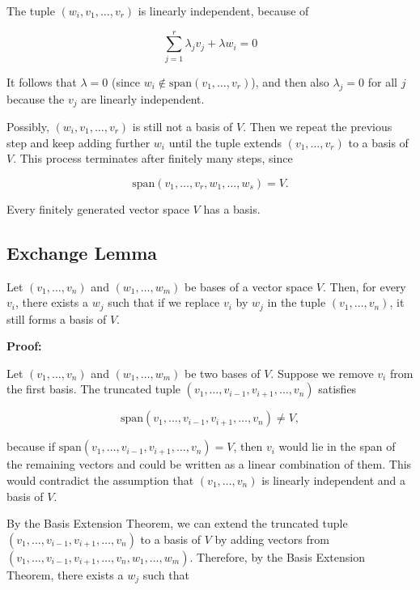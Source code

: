 The tuple \((w_i, v_1, \ldots, v_r)\) is linearly independent, because of

\[
	\sum_{j=1}^r \lambda_j v_j + \lambda w_i = 0
\]

It follows that \(\lambda = 0\) (since \(w_i \notin \text{span}(v_1, \ldots, v_r)\)), and then also 
\(\lambda_j = 0\) for all \(j\) because the \(v_j\) are linearly independent.

Possibly, \((w_i, v_1, \ldots, v_r)\) is still not a basis of \(V\). Then we repeat the previous step and 
keep adding further \(w_i\) until the tuple extends \((v_1, \ldots, v_r)\) to a basis of \(V\). This 
process terminates after finitely many steps, since

\[
	\text{span}(v_1, \ldots, v_r, w_1, \ldots, w_s) = V.
\]

\QED
\vspace{\baselineskip}

Every finitely generated vector space \(V\) has a basis.

\subsection{Exchange Lemma}

Let \((v_1, \ldots, v_n)\) and \((w_1, \ldots, w_m)\) be bases of a vector space \(V\). Then, for every 
\(v_i\), there exists a \(w_j\) such that if we replace \(v_i\) by \(w_j\) in the tuple 
\((v_1, \ldots, v_n)\), it still forms a basis of \(V\).
\vspace{\baselineskip}

\textbf{Proof:}

Let \((v_1, \ldots, v_n)\) and \((w_1, \ldots, w_m)\) be two bases of \(V\). Suppose we remove \(v_i\) 
from the first basis. The truncated tuple \((v_1, \ldots, v_{i-1}, v_{i+1}, \ldots, v_n)\) satisfies

\[
	\text{span}(v_1, \ldots, v_{i-1}, v_{i+1}, \ldots, v_n) \neq V,
\]

because if \(\text{span}(v_1, \ldots, v_{i-1}, v_{i+1}, \ldots, v_n) = V\), then \(v_i\) would lie in the 
span of the remaining vectors and could be written as a linear combination of them. This would contradict 
the assumption that \((v_1, \ldots, v_n)\) is linearly independent and a basis of \(V\).

By the Basis Extension Theorem, we can extend the truncated 
tuple \((v_1, \ldots, v_{i-1}, v_{i+1}, \ldots, v_n)\) to a basis of \(V\) by 
adding vectors from \((v_1, \ldots, v_{i-1}, v_{i+1}, \ldots, v_n, w_1, \ldots, w_m)\). 
Therefore, by the Basis Extension Theorem, there exists a \(w_j\) such that

